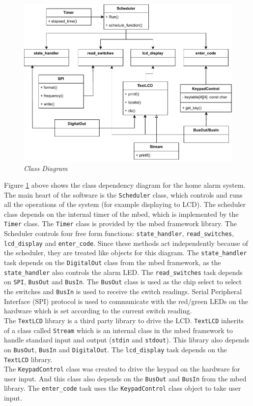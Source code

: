 \documentclass[aps, secnumarabic, balancelastpage, asmath, amssymb, nofootinbib, floatfix,]{revtex4-2}
\begin{document}
{\begin{figure}[h]
  \centering
  \includegraphics[scale = 1.08]{class.drawio.pdf}
  \caption{\em Class Diagram}
  \label{fig:image2}
\end{figure}

Figure \ref{fig:image2} above shows the class dependency diagram for the home alarm system. The main heart of the software is the \verb|Scheduler| class, which controls and runs all the operations of the system (for example displaying to LCD). The scheduler class depends on the internal timer of the mbed, which is implemented by the \verb|Timer| class. The \verb|Timer| class is provided by the mbed framework library. The Scheduler controls four free form functions: \verb|state_handler|, \verb|read_switches|, \verb|lcd_display| and \verb|enter_code|. Since these methods act independently because of the scheduler, they are treated like objects for this diagram. The \verb|state_handler| task depends on the \verb|DigitalOut| class from the mbed framework, as the \verb|state_handler| also controls the alarm LED. The \verb|read_switches| task depends on \verb|SPI|, \verb|BusOut| and \verb|BusIn|. The \verb|BusOut| class is used as the chip select to select the switches and \verb|BusIn| is used to receive the switch readings. Serial Peripheral Interface (SPI) protocol is used to communicate with the red/green LEDs on the hardware which is set according to the current switch reading.\\
The \verb|TextLCD| library is a third party library to drive the LCD. \verb|TextLCD| inherits of a class called \verb|Stream| which is an internal class in the mbed framework to handle standard input and output (\verb|stdin| and \verb|stdout|). This library also depends on \verb|BusOut|, \verb|BusIn| and \verb|DigitalOut|. The \verb|lcd_display| task depends on the \verb|TextLCD| library.\\
The \verb|KeypadControl| class was created to drive the keypad on the hardware for user input. And this class also depends on the \verb|BusOut| and \verb|BusIn| from the mbed library. The \verb|enter_code| task uses the \verb|KeypadControl| class object to take user input.

}
\end{document}
